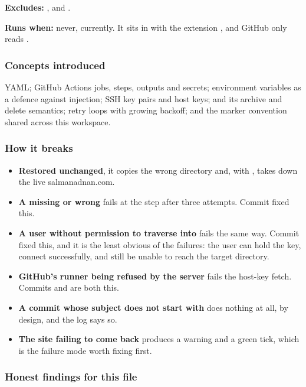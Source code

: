 \textbf{Excludes:} ,  and .

\textbf{Runs when:} never, currently. It sits in 
with the extension , and GitHub only reads
.

\subsubsection*{Concepts introduced}

YAML; GitHub Actions jobs, steps, outputs and secrets; environment variables as a
defence against injection; SSH key pairs and host keys;  and its
archive and delete semantics; retry loops with growing backoff; and the
\code{[deploy]} marker convention shared across this workspace.

\subsubsection*{How it breaks}

\begin{itemize}
\item \textbf{Restored unchanged}, it copies the wrong directory and, with
  , takes down the live salmanadnan.com.
\item \textbf{A missing or wrong } fails at the 
  step after three attempts. Commit  fixed this.
\item \textbf{A  user without permission to traverse into
  } fails the same way. Commit  fixed this, and it is the
  least obvious of the failures: the user can hold the key, connect successfully, and
  still be unable to reach the target directory.
\item \textbf{GitHub's runner being refused by the server} fails the host-key fetch.
  Commits  and  are both this.
\item \textbf{A commit whose subject does not start with \code{[deploy]}} does
  nothing at all, by design, and the log says so.
\item \textbf{The site failing to come back} produces a warning and a green tick,
  which is the failure mode worth fixing first.
\end{itemize}

\subsubsection*{Honest findings for this file}

